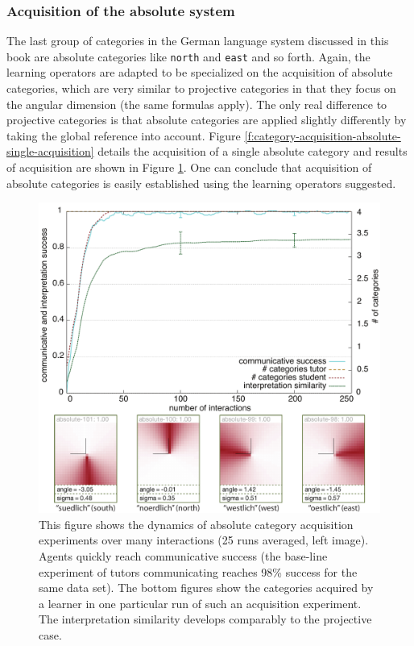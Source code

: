 \subsubsection{Acquisition of the absolute system}
The last group of categories in the German language system discussed in this book
are absolute categories like {\footnotesize\tt north} and {\footnotesize\tt east} and so forth. Again,
the learning operators are adapted to be specialized on the acquisition of absolute
categories, which are very similar to projective categories in that they focus on
the angular dimension (the same formulas apply). The only real difference to
projective categories is that absolute categories are applied slightly differently
by taking the global reference into account. Figure 
\ref{f:category-acquisition-absolute-single-acquisition} details the acquisition
of a single absolute category and results of acquisition are shown 
in Figure \ref{f:category-acquisition-absolute-results}. One can conclude that
acquisition of absolute categories is easily established using the 
learning operators suggested.

\begin{figure} 
\begin{center}
\includegraphics[width=1.0\columnwidth]{figs/category-acquisition-absolute-results+categories}
\end{center}
\caption[Results acquisition of the absolute system]{This figure shows the 
dynamics of absolute category acquisition experiments 
over many interactions (25 runs averaged, 
left image). Agents quickly reach communicative success (the base-line experiment 
of tutors communicating reaches 98\% success for the same data set). 
The bottom figures show the categories acquired by a learner in one particular run of such 
an acquisition experiment. The interpretation similarity develops comparably to the projective
case.}
\label{f:category-acquisition-absolute-results}
\end{figure}

